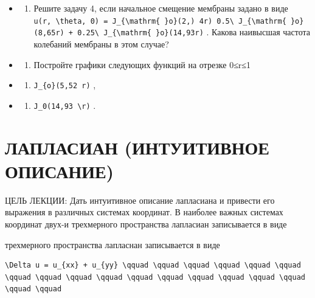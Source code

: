 \documentclass[
  ukrainian,
]{article}
\providecommand{\tightlist}{%
  \setlength{\itemsep}{0pt}\setlength{\parskip}{0pt}}
\begin{document}
\begin{itemize}
\tightlist
\item
  \begin{enumerate}
  \def\labelenumi{\arabic{enumi}.}
  \setcounter{enumi}{4}
  \tightlist
  \item
    Решите задачу 4, если начальное смещение мембраны задано в виде
    \texttt{u(r,\ \textbackslash{}theta,\ 0)\ =\ J\_\{\textbackslash{}mathrm\{\ \}o\}(2,)\ 4r)\ 0.5\textbackslash{}\ J\_\{\textbackslash{}mathrm\{\ \}o\}(8,65r)\ +\ 0.25\textbackslash{}\ J\_\{\textbackslash{}mathrm\{\ \}o\}(14,93r)}
    . Какова наивысшая частота колебаний мембраны в этом случае?
  \end{enumerate}
\item
  \begin{enumerate}
  \def\labelenumi{\arabic{enumi}.}
  \setcounter{enumi}{5}
  \tightlist
  \item
    Постройте графики следующих функций на отрезке 0≤r≤1
  \end{enumerate}
\item
  \begin{enumerate}
  \def\labelenumi{\alph{enumi})}
  \tightlist
  \item
    \texttt{J\_\{o\}(5,52\ r)} ,
  \end{enumerate}
\item
  \begin{enumerate}
  \def\labelenumi{\arabic{enumi})}
  \setcounter{enumi}{5}
  \tightlist
  \item
    \texttt{J\_0(14,93\ \textbackslash{}r)} .
  \end{enumerate}
\end{itemize}

\section{ЛАПЛАСИАН (ИНТУИТИВНОЕ
ОПИСАНИЕ)}\label{ux43bux430ux43fux43bux430ux441ux438ux430ux43d-ux438ux43dux442ux443ux438ux442ux438ux432ux43dux43eux435-ux43eux43fux438ux441ux430ux43dux438ux435}

ЦЕЛЬ ЛЕКЦИИ: Дать интуитивное описание лапласиана и привести его
выражения в различных системах координат. В наиболее важных системах
координат двух-и трехмерного пространства лапласиан записывается в виде

трехмерного пространства лапласнан записывается в виде

\begin{verbatim}
\Delta u = u_{xx} + u_{yy} \qquad \qquad \qquad \qquad \qquad \qquad \qquad \qquad \qquad \qquad \qquad \qquad \qquad \qquad \qquad \qquad \qquad \qquad
\end{verbatim}
\end{document}
